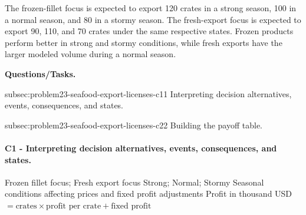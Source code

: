 	The frozen-fillet focus is expected to export 120 crates in a strong season, 100 in a normal season, and 80 in a stormy season. The fresh-export focus is expected to export 90, 110, and 70 crates under the same respective states. Frozen products perform better in strong and stormy conditions, while fresh exports have the larger modeled volume during a normal season.

	\textbf{Questions/Tasks.}
	\begin{enumerate}
		\CriterionTask
		{subsec:problem23-seafood-export-licenses-c1}{1}
		{Interpreting decision alternatives, events, consequences, and states.}

		\CriterionTask
		{subsec:problem23-seafood-export-licenses-c2}{2}
		{Building the payoff table.}
	\end{enumerate}

\paragraph*{C1 - Interpreting decision alternatives, events, consequences, and states.}
	\label{subsec:problem23-seafood-export-licenses-c1}
	\DecisionElementsTable
	{Frozen fillet focus; Fresh export focus}
	{Strong; Normal; Stormy}
	{Seasonal conditions affecting prices and fixed profit adjustments}
	{Profit in thousand USD $= \text{crates} \times \text{profit per crate} + \text{fixed profit}$}


